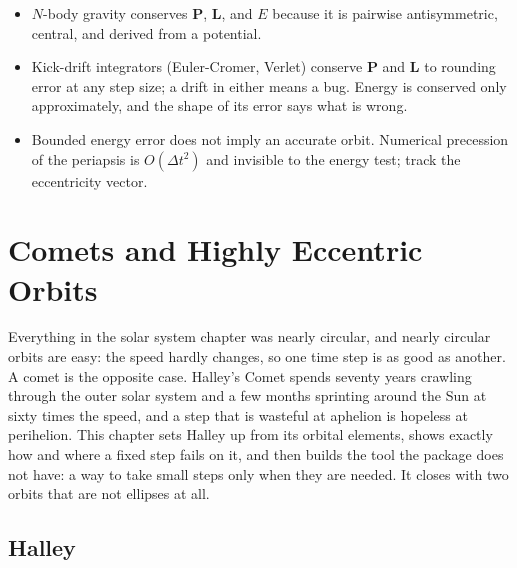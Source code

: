 \documentclass[
  10.5pt,
  letterpaper,
]{scrbook}
\providecommand{\tightlist}{%
  \setlength{\itemsep}{0pt}\setlength{\parskip}{0pt}}
\theoremstyle{plain}
\theoremstyle{remark}
\begin{document}
\begin{tcolorbox}[enhanced jigsaw, arc=.35mm, bottomrule=.15mm, bottomtitle=1mm, breakable, colback=white, colbacktitle=quarto-callout-tip-color!10!white, colframe=quarto-callout-tip-color-frame, coltitle=black, left=2mm, leftrule=.75mm, opacityback=0, opacitybacktitle=0.6, rightrule=.15mm, title={Key results}, titlerule=0mm, toprule=.15mm, toptitle=1mm]

\begin{itemize}
\tightlist
\item
  \(N\)-body gravity conserves \(\mathbf{P}\), \(\mathbf{L}\), and \(E\)
  because it is pairwise antisymmetric, central, and derived from a
  potential.
\item
  Kick-drift integrators (Euler-Cromer, Verlet) conserve \(\mathbf{P}\)
  and \(\mathbf{L}\) to rounding error at any step size; a drift in
  either means a bug. Energy is conserved only approximately, and the
  shape of its error says what is wrong.
\item
  Bounded energy error does not imply an accurate orbit. Numerical
  precession of the periapsis is \(O(\Delta t^2)\) and invisible to the
  energy test; track the eccentricity vector.
\end{itemize}

\end{tcolorbox}

\chapter{Comets and Highly Eccentric Orbits}\label{sec-comets}

Everything in the solar system chapter was nearly circular, and nearly
circular orbits are easy: the speed hardly changes, so one time step is
as good as another. A comet is the opposite case. Halley's Comet spends
seventy years crawling through the outer solar system and a few months
sprinting around the Sun at sixty times the speed, and a step that is
wasteful at aphelion is hopeless at perihelion. This chapter sets Halley
up from its orbital elements, shows exactly how and where a fixed step
fails on it, and then builds the tool the package does not have: a way
to take small steps only when they are needed. It closes with two orbits
that are not ellipses at all.

\section{Halley}\label{halley}
\end{document}
